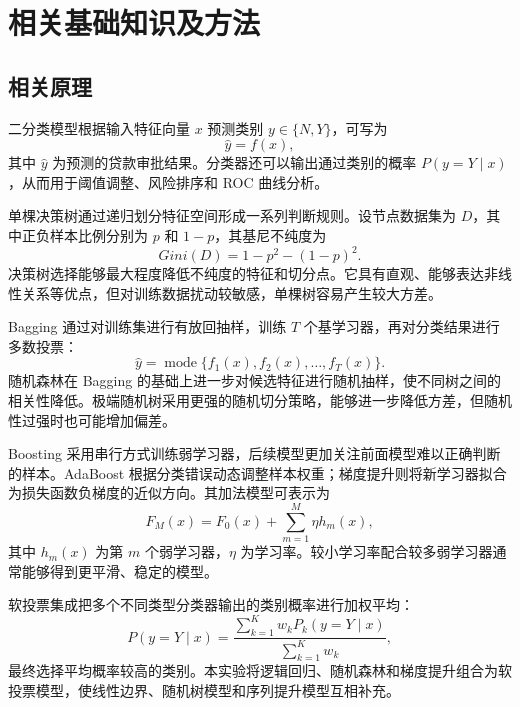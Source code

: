 \documentclass[UTF8,a4paper,12pt]{ctexart}
\begin{document}
\section{相关基础知识及方法}

\subsection{相关原理}

二分类模型根据输入特征向量 $x$ 预测类别 $y\in\{N,Y\}$，可写为
\begin{equation}
    \hat{y}=f(x),
\end{equation}
其中 $\hat{y}$ 为预测的贷款审批结果。分类器还可以输出通过类别的概率 $P(y=Y\mid x)$，从而用于阈值调整、风险排序和 ROC 曲线分析。

单棵决策树通过递归划分特征空间形成一系列判断规则。设节点数据集为 $D$，其中正负样本比例分别为 $p$ 和 $1-p$，其基尼不纯度为
\begin{equation}
    Gini(D)=1-p^2-(1-p)^2.
\end{equation}
决策树选择能够最大程度降低不纯度的特征和切分点。它具有直观、能够表达非线性关系等优点，但对训练数据扰动较敏感，单棵树容易产生较大方差。

Bagging 通过对训练集进行有放回抽样，训练 $T$ 个基学习器，再对分类结果进行多数投票：
\begin{equation}
    \hat{y}=\operatorname{mode}\{f_1(x),f_2(x),\ldots,f_T(x)\}.
\end{equation}
随机森林在 Bagging 的基础上进一步对候选特征进行随机抽样，使不同树之间的相关性降低。极端随机树采用更强的随机切分策略，能够进一步降低方差，但随机性过强时也可能增加偏差。

Boosting 采用串行方式训练弱学习器，后续模型更加关注前面模型难以正确判断的样本。AdaBoost 根据分类错误动态调整样本权重；梯度提升则将新学习器拟合为损失函数负梯度的近似方向。其加法模型可表示为
\begin{equation}
    F_M(x)=F_0(x)+\sum_{m=1}^{M}\eta h_m(x),
\end{equation}
其中 $h_m(x)$ 为第 $m$ 个弱学习器，$\eta$ 为学习率。较小学习率配合较多弱学习器通常能够得到更平滑、稳定的模型。

软投票集成把多个不同类型分类器输出的类别概率进行加权平均：
\begin{equation}
    P(y=Y\mid x)=\frac{\sum_{k=1}^{K}w_kP_k(y=Y\mid x)}{\sum_{k=1}^{K}w_k},
\end{equation}
最终选择平均概率较高的类别。本实验将逻辑回归、随机森林和梯度提升组合为软投票模型，使线性边界、随机树模型和序列提升模型互相补充。
\end{document}
